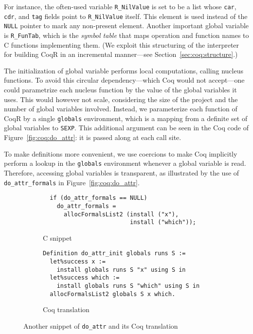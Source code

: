 \documentclass[
    sigplan,
    10pt,
    review, %
    natbib=false %
 ]{acmart}
\newcommand\CoqR{CoqR}
\newcommand\changed[1]{{\color{cyan} #1}}
\begin{document}
For instance, the often-used variable \texttt{R_NilValue}
is set to be a list whose \texttt{car}, \texttt{cdr},
and \texttt{tag} fields point to \texttt{R_NilValue} itself.
This element is used instead of the \texttt{NULL} pointer
to mark any non-present element. Another important global variable is
\texttt{R_FunTab}, which is the {\em symbol table} that maps operation and function names to C functions implementing them. (We exploit this structuring of the interpreter for building \CoqR{} in an incremental manner---see Section~\ref{sec:coq:structure}.)

%
\changed{The initialization of global variable performs local computations, calling nucleus functions.}
To avoid this circular dependency---which Coq would not accept---one could parametrize each nucleus function by the value of the global variables it uses.
This would however not scale, considering the size of the project and the number of global variables involved.
%
Instead, we parameterize each function of \CoqR{} by a single \texttt{globals} environment, which is a mapping from a definite set of global variables to \texttt{SEXP}. This additional argument can be seen in the Coq code of Figure~\ref{fig:coq:do_attr}: it is passed along at each call site.

To make definitions more convenient, we use coercions to make Coq implicitly perform a lookup in the \texttt{globals} environment whenever a global variable is read. Therefore, accessing global variables is transparent, as illustrated by the use of \texttt{do_attr_formals} in Figure~\ref{fig:coq:do_attr}.


\begin{figure*}
    \centering{}
\begin{subfigure}{.5\textwidth}
\begin{verbatim}
  if (do_attr_formals == NULL)
    do_attr_formals =
      allocFormalsList2 (install ("x"),
                         install ("which"));
\end{verbatim}
    \caption{C snippet}
    \label{fig:c:do_attr:formals}
\end{subfigure}
\begin{subfigure}{.49\textwidth}
\begin{verbatim}
Definition do_attr_init globals runs S :=
  let%success x :=
    install globals runs S "x" using S in
  let%success which :=
    install globals runs S "which" using S in
  allocFormalsList2 globals S x which.
\end{verbatim}
    \caption{Coq translation}
    \label{fig:coq:do_attr:formals}
\end{subfigure}
\vspace{-1em}
    \caption{Another snippet of \texttt{do_attr} and its Coq translation}
    \label{fig:do_attr:formals}
\end{figure*}
\end{document}
